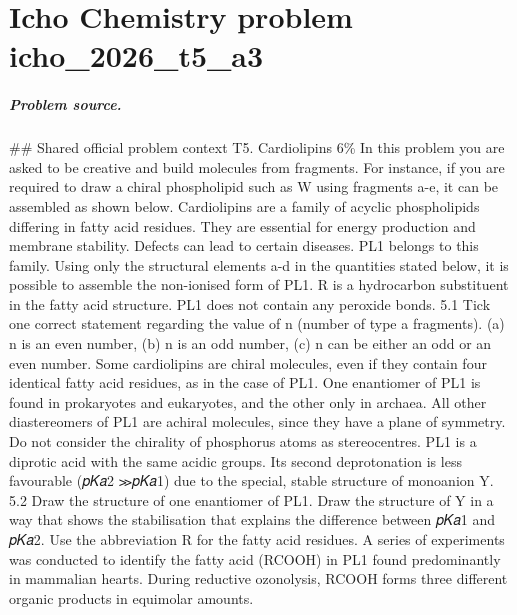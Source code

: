 
\chapter{Icho Chemistry problem icho\_2026\_t5\_a3}
\label{ch:IChO2026Problems_problem_icho_2026_t5_a3}

\paragraph{Problem source.}
\#\# Shared official problem context
T5. Cardiolipins 6\% In this problem you are asked to be creative and build molecules from fragments. For instance, if you are required to draw a chiral phospholipid such as W using fragments a-e, it can be assembled as shown below. Cardiolipins are a family of acyclic phospholipids differing in fatty acid residues. They are essential for energy production and membrane stability. Defects can lead to certain diseases. PL1 belongs to this family. Using only the structural elements a-d in the quantities stated below, it is possible to assemble the non-ionised form of PL1. R is a hydrocarbon substituent in the fatty acid structure. PL1 does not contain any peroxide bonds. 5.1 Tick one correct statement regarding the value of n (number of type a fragments). (a) n is an even number, (b) n is an odd number, (c) n can be either an odd or an even number. Some cardiolipins are chiral molecules, even if they contain four identical fatty acid residues, as in the case of PL1. One enantiomer of PL1 is found in prokaryotes and eukaryotes, and the other only in archaea. All other diastereomers of PL1 are achiral molecules, since they have a plane of symmetry. Do not consider the chirality of phosphorus atoms as stereocentres. PL1 is a diprotic acid with the same acidic groups. Its second deprotonation is less favourable (𝑝𝐾𝑎2 ≫𝑝𝐾𝑎1) due to the special, stable structure of monoanion Y. 5.2 Draw the structure of one enantiomer of PL1. Draw the structure of Y in a way that shows the stabilisation that explains the difference between 𝑝𝐾𝑎1 and 𝑝𝐾𝑎2. Use the abbreviation R for the fatty acid residues. A series of experiments was conducted to identify the fatty acid (RCOOH) in PL1 found predominantly in mammalian hearts. During reductive ozonolysis, RCOOH forms three different organic products in equimolar amounts.

